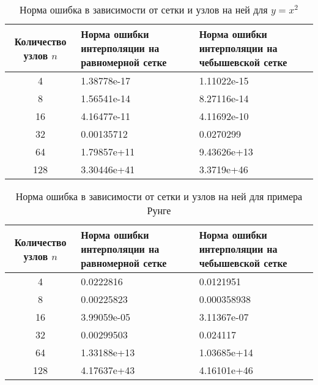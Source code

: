\documentclass{article}
\begin{document}
    
    \begin{table}[H]
        \centering
        \caption{Норма ошибка в зависимости от сетки и узлов на ней для $y = x^2$}
        \begin{tabular}{|c|p{5cm}|p{5cm}|}
            \hline
            Количество узлов $n$ & Норма ошибки интерполяции
            на равномерной сетке & Норма ошибки интерполяции
            на чебышевской сетке \\
            \hline 
            4 & 1.38778e-17 & 1.11022e-15 \\ \hline
            8 & 1.56541e-14 & 8.27116e-14\\ \hline
            16 &4.16477e-11 & 4.11692e-10\\ \hline
            32 & 0.00135712 &  0.0270299\\ \hline
            64 &1.79857e+11 & 9.43626e+13\\ \hline
            128 &3.30446e+41&   3.3719e+46\\ \hline
        \end{tabular}
    \end{table}
    \begin{table}[H]
        \centering
        \caption{Норма ошибка в зависимости от сетки и узлов на ней для примера Рунге}
        \begin{tabular}{|c|p{5cm}|p{5cm}|}
            \hline
            Количество узлов $n$ & Норма ошибки интерполяции
            на равномерной сетке & Норма ошибки интерполяции
            на чебышевской сетке \\
            \hline 
            4 & 0.0222816 &   0.0121951 \\ \hline
            8 & 0.00225823 & 0.000358938\\ \hline
            16 &3.99059e-05 & 3.11367e-07\\ \hline
            32 &  0.00299503 &  0.024117\\ \hline
            64 &1.33188e+13 & 1.03685e+14\\ \hline
            128 & 4.17637e+43&   4.16101e+46\\ \hline
        \end{tabular}
    \end{table}
\end{document}
